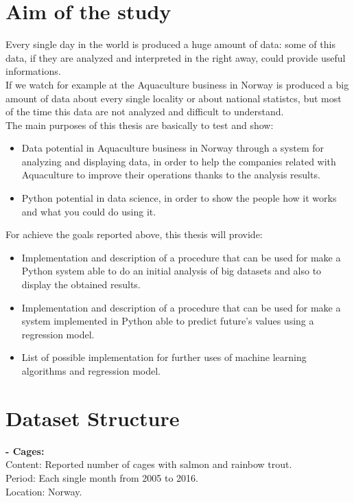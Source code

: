


\section{Aim of the study}
Every single day in the world is produced a huge amount of data: some of this data, if they are analyzed and interpreted in the right away, could provide useful informations.\\
If we watch for example at the Aquaculture business in Norway is produced a big amount of data about every single locality or about national statistcs, but most of the time this data are not analyzed and difficult to understand.\\
The main purposes of this thesis are basically to test and show:
\begin{itemize} 
 \item 	Data potential in Aquaculture business in Norway through a system for analyzing and displaying data, in order to help the companies related with Aquaculture to improve their operations thanks to the analysis results.
 \item 	Python potential in data science, in order to show the people how it works and what you could do using it.
 \end{itemize}
For achieve the goals reported above, this thesis will provide:
\begin{itemize} 
 \item 	Implementation and description of a procedure that can be used for make a Python system able to do an initial analysis of  big datasets and also to display the obtained results.
 \item Implementation and description of a procedure that can be used for make a system implemented in Python able to predict future’s values using a regression model.
 \item List of possible implementation for further uses of machine learning algorithms and regression model.
 
 \end{itemize}

\newpage
\section{Dataset Structure}

\textbf{- Cages:}
	\\ Content: Reported number of cages with salmon and rainbow trout.
	\\ Period:  Each single month  from 2005 to 2016.
	\\ Location: Norway.

